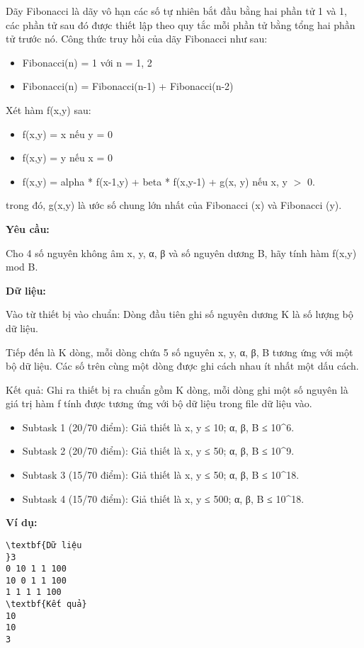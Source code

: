 

Dãy Fibonacci là dãy vô hạn các số tự nhiên bắt đầu bằng hai phần tử 1 và 1, các phần tử sau đó được thiết lập theo quy tắc mỗi phần tử bằng tổng hai phần tử trước nó. Công thức truy hồi của dãy Fibonacci như sau:
\begin{itemize}
	\item Fibonacci(n) = 1 với n = 1, 2
	\item Fibonacci(n) = Fibonacci(n-1) + Fibonacci(n-2)
\end{itemize}

Xét hàm f(x,y) sau:
\begin{itemize}
	\item f(x,y) = x nếu y = 0
	\item f(x,y) = y nếu x = 0
	\item f(x,y) = alpha * f(x-1,y) + beta * f(x,y-1) + g(x, y) nếu x, y $>$ 0.
\end{itemize}

trong đó, g(x,y) là ước số chung lớn nhất của Fibonacci (x) và Fibonacci (y).

\textbf{Yêu cầu:}

Cho 4 số nguyên không âm x, y, α, β và số nguyên dương B, hãy tính hàm f(x,y) mod B.

\textbf{Dữ liệu:}

Vào từ thiết bị vào chuẩn: Dòng đầu tiên ghi số nguyên dương K là số lượng bộ dữ liệu.

Tiếp đến là K dòng, mỗi dòng chứa 5 số nguyên x, y, α, β, B tương ứng với một bộ dữ liệu. Các số trên cùng một dòng được ghi cách nhau ít nhất một dấu cách.

Kết quả: Ghi ra thiết bị ra chuẩn gồm K dòng, mỗi dòng ghi một số nguyên là giá trị hàm f tính được tương ứng với bộ dữ liệu trong file dữ liệu vào.
\begin{itemize}
	\item Subtask 1 (20/70 điểm): Giả thiết là x, y ≤ 10; α, β, B ≤ 10^6.
	\item Subtask 2 (20/70 điểm): Giả thiết là x, y ≤ 50; α, β, B ≤ 10^9.
	\item Subtask 3 (15/70 điểm): Giả thiết là x, y ≤ 50; α, β, B ≤ 10^18.
	\item Subtask 4 (15/70 điểm): Giả thiết là x, y ≤ 500; α, β, B ≤ 10^18.
\end{itemize}

\textbf{Ví dụ:}
\begin{verbatim}
\textbf{Dữ liệu
}3
0 10 1 1 100
10 0 1 1 100
1 1 1 1 100
\textbf{Kết quả}
10
10
3

\end{verbatim}
